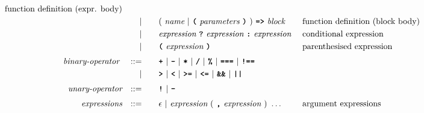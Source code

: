\begin{alignat*}{9}
                                                           && \textrm{function definition (expr. body)}\\
&&                       && |   &\quad &&   (\ \textit{name}\ | \
                                               \textbf{\texttt{(}}\ \textit{parameters}\ \textbf{\texttt{)}}\
                                            )\    
                                            \texttt{\textbf{=>}}\ \textit{block}
                                                           && \textrm{function definition (block body)}\\
&&                       && |   &\quad &&   \textit{expression} \ \textbf{\texttt{?}}\ 
                                            \textit{expression}
                                            \ \textbf{\texttt{:}}\
                                            \textit{expression}\
                                                           && \textrm{conditional expression}\\
&&                       && |   &\quad &&  \textbf{\texttt{(}}\  \textit{expression} \ 
                                            \textbf{\texttt{)}} && \textrm{parenthesised expression}\\[1mm]
&& \textit{binary-operator}    \ 
                        && ::= &\quad && \textbf{\texttt{+}}\ |\ \textbf{\texttt{-}}\ |\ \textbf{\texttt{*}}\ |\ \textbf{\texttt{/}}\ |\ \textbf{\texttt{\%}}\ |\ 
                                   \textbf{\texttt{===}}\ |\ \textbf{\texttt{!==}}\ \\
&&                       && |  &\quad &&  \texttt{\textbf{>}}\ |\ \texttt{\textbf{<}}\ |\ \texttt{\textbf{>=}}\ |\ \texttt{\textbf{<=}}\
                                          |\ \textbf{\texttt{\&\&}}\ |\ \texttt{\textbf{||}}\  \\[1mm]
&& \textit{unary-operator}    
                        && ::= &\quad && \textbf{\texttt{!}}\ |\ \textbf{\texttt{-}}\\[1mm]
&& \textit{expressions}  && ::= &\quad && \epsilon\ | \ \textit{expression}\ (
                                                               \ \textbf{\texttt{,}} \
                                                                 \textit{expression} \ 
                                                                      )\ \ldots
                                                            && \textrm{argument expressions} 
\end{alignat*}

\newpage















\newpage



    
